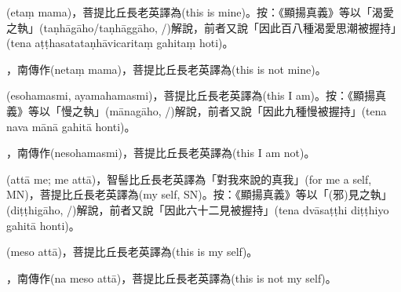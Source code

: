\startitemgroup[noteitems]
\item{}(etaṃ mama)，菩提比丘長老英譯為(this is mine)。按：《顯揚真義》等以「渴愛之執」(taṇhāgāho/taṇhāggāho, /)解說，前者又說「因此百八種渴愛思潮被握持」(tena aṭṭhasatataṇhāvicaritaṃ gahitaṃ hoti)。
\item{}，南傳作(netaṃ mama)，菩提比丘長老英譯為(this is not mine)。
\stopitemgroup

\startitemgroup[noteitems]
\item{}(esohamasmi, ayamahamasmi)，菩提比丘長老英譯為(this I am)。按：《顯揚真義》等以「慢之執」(mānagāho, /)解說，前者又說「因此九種慢被握持」(tena nava mānā gahitā honti)。
\item{}，南傳作(nesohamasmi)，菩提比丘長老英譯為(this I am not)。
\stopitemgroup

\startitemgroup[noteitems]
\item{}(attā me; me attā)，智髻比丘長老英譯為「對我來說的真我」(for me a self, MN)，菩提比丘長老英譯為(my self, SN)。按：《顯揚真義》等以「(邪)見之執」(diṭṭhigāho, /)解說，前者又說「因此六十二見被握持」(tena dvāsaṭṭhi diṭṭhiyo gahitā honti)。
\item{}(meso attā)，菩提比丘長老英譯為(this is my self)。
\item{}，南傳作(na meso attā)，菩提比丘長老英譯為(this is not my self)。
\stopitemgroup

